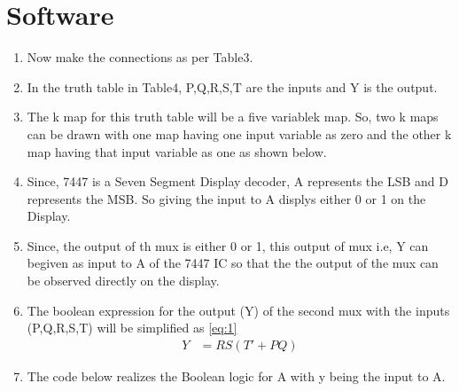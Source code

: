 \documentclass{article}
\begin{document}
\section{Software}
		\begin{enumerate}
			\item Now make the connections as per Table3.
				
			\item In the truth table in Table4, P,Q,R,S,T are the inputs and Y is the output.
				
			\item The k map for this truth table will be a five variablek map. So, two k maps can be drawn with one map having one input variable as zero and the other k map having that input variable as one as shown below.
				
		\item Since, 7447 is a Seven Segment Display decoder, A represents the LSB and D represents the MSB. So giving the input to A displys either 0 or 1 on the Display.
			\item Since, the output of th mux is either 0 or 1, this output of mux i.e, Y can begiven as input to A of the 7447 IC so that the the output of the mux can be observed directly on the display.
			\item The boolean expression for the output (Y) of the second mux with the inputs (P,Q,R,S,T) will be simplified as \ref{eq:1}
				\begin{align}
					{Y} &= {RS(T'+PQ)}
					\label{eq:1}
				\end{align}
				\item The code below realizes the Boolean logic for A with y being the input to A.\\
\end{enumerate}
\end{document}
